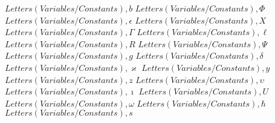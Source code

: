 \documentclass{article}
\begin{document}
$Letters (Variables/Constants),b$
\linebreak
\linebreak
$Letters (Variables/Constants),\Phi$
\linebreak
\linebreak
$Letters (Variables/Constants),\epsilon$
\linebreak
\linebreak
$Letters (Variables/Constants),X$
\linebreak
\linebreak
$Letters (Variables/Constants),\Gamma$
\linebreak
\linebreak
$Letters (Variables/Constants),\ell$
\linebreak
\linebreak
$Letters (Variables/Constants),R$
\linebreak
\linebreak
$Letters (Variables/Constants),\Psi$
\linebreak
\linebreak
$Letters (Variables/Constants),g$
\linebreak
\linebreak
$Letters (Variables/Constants),\delta$
\linebreak
\linebreak
$Letters (Variables/Constants),\varkappa$
\linebreak
\linebreak
$Letters (Variables/Constants),y$
\linebreak
\linebreak
$Letters (Variables/Constants),z$
\linebreak
\linebreak
$Letters (Variables/Constants),\upsilon$
\linebreak
\linebreak
$Letters (Variables/Constants),\imath$
\linebreak
\linebreak
$Letters (Variables/Constants),U$
\linebreak
\linebreak
$Letters (Variables/Constants),\omega$
\linebreak
\linebreak
$Letters (Variables/Constants),\hbar$
\linebreak
\linebreak
$Letters (Variables/Constants),s$
\linebreak
\linebreak
\end{document}
